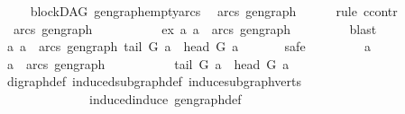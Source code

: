 \begin{isabellebody}
\ \ \isanewline
%
\endisadelimproof
\isanewline
{}\isamarkupfalse%
\ {\isacharparenleft}{\kern0pt}\ blockDAG{\isacharparenright}{\kern0pt}\ gen{\isacharunderscore}{\kern0pt}graph{\isacharunderscore}{\kern0pt}empty{\isacharunderscore}{\kern0pt}arcs{\isacharcolon}{\kern0pt}\ \isanewline
\ {\isachardoublequoteopen}arcs\ gen{\isacharunderscore}{\kern0pt}graph\ {\isacharequal}{\kern0pt}\ {\isacharbraceleft}{\kern0pt}{\isacharbraceright}{\kern0pt}{\isachardoublequoteclose}\isanewline
%
\isadelimproof
\ \ \ %
\endisadelimproof
%
\isatagproof
{}\isamarkupfalse%
{\isacharparenleft}{\kern0pt}rule\ ccontr{\isacharparenright}{\kern0pt}\isanewline
\ \ \ \ \ \isamarkupfalse%
\ {\isachardoublequoteopen}{\isasymnot}\ arcs\ gen{\isacharunderscore}{\kern0pt}graph\ {\isacharequal}{\kern0pt}\ {\isacharbraceleft}{\kern0pt}{\isacharbraceright}{\kern0pt}{\isachardoublequoteclose}\isanewline
\ \ \ \ \ \isamarkupfalse%
\ \isamarkupfalse%
\ ex{\isacharcolon}{\kern0pt}\ {\isachardoublequoteopen}{\isasymexists}a{\isachardot}{\kern0pt}\ a\ {\isasymin}\ {\isacharparenleft}{\kern0pt}arcs\ gen{\isacharunderscore}{\kern0pt}graph{\isacharparenright}{\kern0pt}{\isachardoublequoteclose}\isanewline
\ \ \ \ \ \ \ \isamarkupfalse%
\ blast\isanewline
\ \ \ \ \ \isamarkupfalse%
\ \isamarkupfalse%
\ {\isachardoublequoteopen}{\isasymforall}a{\isachardot}{\kern0pt}\ a\ {\isasymin}\ {\isacharparenleft}{\kern0pt}arcs\ gen{\isacharunderscore}{\kern0pt}graph{\isacharparenright}{\kern0pt}{\isasymlongrightarrow}\ tail\ G\ a\ {\isacharequal}{\kern0pt}\ head\ G\ a{\isachardoublequoteclose}\isanewline
\ \ \ \ \ \isamarkupfalse%
\ safe\isanewline
\ \ \ \ \ \ \ \isamarkupfalse%
\ a\isanewline
\ \ \ \ \ \ \ \isamarkupfalse%
\ {\isachardoublequoteopen}a\ {\isasymin}\ arcs\ gen{\isacharunderscore}{\kern0pt}graph{\isachardoublequoteclose}\isanewline
\ \ \ \ \ \ \ \isamarkupfalse%
\ \isamarkupfalse%
\ {\isachardoublequoteopen}tail\ G\ a\ {\isacharequal}{\kern0pt}\ head\ G\ a{\isachardoublequoteclose}\isanewline
\ \ \ \ \ \ \ \ \ \isamarkupfalse%
\ digraph{\isacharunderscore}{\kern0pt}def\ induced{\isacharunderscore}{\kern0pt}subgraph{\isacharunderscore}{\kern0pt}def\ induce{\isacharunderscore}{\kern0pt}subgraph{\isacharunderscore}{\kern0pt}verts\isanewline
\ \ \ \ \ \ \ \ \ \ \ \ \ \ induced{\isacharunderscore}{\kern0pt}induce\ gen{\isacharunderscore}{\kern0pt}graph{\isacharunderscore}{\kern0pt}def\ \isamarkupfalse%

\end{isabellebody}
